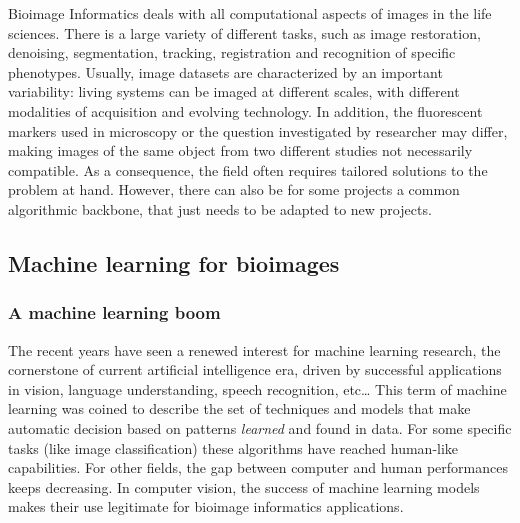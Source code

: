 Bioimage Informatics deals with all computational aspects of images in the life sciences. There is a large variety of different tasks, such as image restoration, denoising, segmentation, tracking, registration and recognition of specific phenotypes. Usually, image datasets are characterized by an important variability: 
living systems can be imaged at different scales, with different modalities of acquisition and evolving technology.
In addition, the fluorescent markers used in microscopy or the question investigated by researcher may differ, making images of the same object from two different studies not necessarily compatible.
As a consequence, the field often requires tailored solutions to the problem at hand. However, there can also be for some projects a common algorithmic backbone, that just needs to be adapted to new projects. 

\subsection{Machine learning for bioimages}
\label{subsec:intro_ml_tools}

\subsubsection{A machine learning boom}

The recent years have seen a renewed interest for machine learning research, the cornerstone of current artificial intelligence era, driven by successful applications in vision, language understanding, speech recognition, etc\dots
This term of machine learning was coined to describe the set of techniques and models that make automatic decision based on patterns \emph{learned} and found in data.
For some specific tasks (like image classification) these algorithms have reached human-like capabilities.
For other fields, the gap between computer and human performances keeps decreasing.
In computer vision, the success of machine learning models makes their use legitimate for bioimage informatics applications.\\

